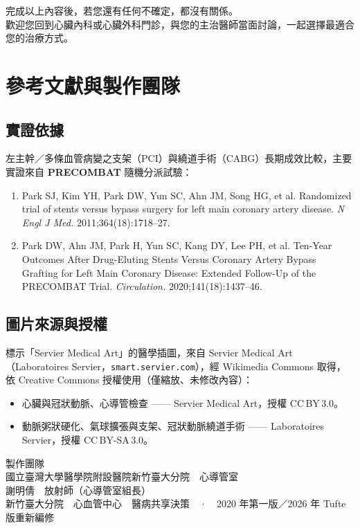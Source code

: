 \documentclass[justified,nobib,openany]{tufte-book}
\begin{document}
\bigskip
\begin{keybox}
完成以上內容後，若您還有任何不確定，都沒有關係。\\[3pt]
歡迎您\heibold\color{hfred}回到心臟內科或心臟外科門診\normalfont\hei\color{hfslate}，與您的主治醫師當面討論，一起選擇最適合您的治療方式。
\end{keybox}

\backmatter
\chapter{參考文獻與製作團隊}

\section*{實證依據}
左主幹／多條血管病變之支架（PCI）與繞道手術（CABG）長期成效比較，主要實證來自 \textbf{PRECOMBAT} 隨機分派試驗：
\begin{enumerate}[leftmargin=1.8em]
\item Park SJ, Kim YH, Park DW, Yun SC, Ahn JM, Song HG, et al. Randomized trial of stents versus bypass surgery for left main coronary artery disease. \textit{N Engl J Med.} 2011;364(18):1718–27.
\item Park DW, Ahn JM, Park H, Yun SC, Kang DY, Lee PH, et al. Ten-Year Outcomes After Drug-Eluting Stents Versus Coronary Artery Bypass Grafting for Left Main Coronary Disease: Extended Follow-Up of the PRECOMBAT Trial. \textit{Circulation.} 2020;141(18):1437–46.
\end{enumerate}


\section*{圖片來源與授權}
標示「Servier Medical Art」的醫學插圖，來自 Servier Medical Art（Laboratoires Servier，\texttt{smart.servier.com}），經 Wikimedia Commons 取得，依 Creative Commons 授權使用（僅縮放、未修改內容）：
\begin{itemize}
\item 心臟與冠狀動脈、心導管檢查 —— Servier Medical Art，授權 CC\,BY\,3.0。
\item 動脈粥狀硬化、氣球擴張與支架、冠狀動脈繞道手術 —— Laboratoires Servier，授權 CC\,BY-SA\,3.0。
\end{itemize}

\vspace{2em}
\begin{fullwidth}\centering
{\heibold\color{hfteal} 製作團隊}\\[8pt]
{\hei\small\color{hfslate}
國立臺灣大學醫學院附設醫院新竹臺大分院　心導管室\\[4pt]
謝明倩　放射師（心導管室組長）}\\[12pt]
{\hei\footnotesize\color{hfslate} 新竹臺大分院　心血管中心　醫病共享決策　·　2020 年第一版／2026 年 Tufte 版重新編修}
\end{fullwidth}
\end{document}
